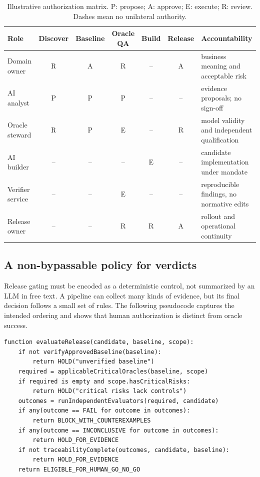 \documentclass[11pt,a4paper]{article}
\begin{document}
\begin{table}[htbp]
\centering\footnotesize
\caption{Illustrative authorization matrix. P: propose; A: approve; E: execute; R: review. Dashes mean no unilateral authority.}
\begin{tabularx}{\linewidth}{@{}p{28mm}cccccX@{}}
\toprule
Role & Discover & Baseline & Oracle QA & Build & Release & Accountability \\
\midrule
Domain owner & R & A & R & -- & A & business meaning and acceptable risk \\
AI analyst & P & P & P & -- & -- & evidence proposals; no sign-off \\
Oracle steward & R & P & E & -- & R & model validity and independent qualification \\
AI builder & -- & -- & -- & E & -- & candidate implementation under mandate \\
Verifier service & -- & -- & E & -- & -- & reproducible findings, no normative edits \\
Release owner & -- & -- & R & R & A & rollout and operational continuity \\
\bottomrule
\end{tabularx}
\label{tab:roles}
\end{table}

\subsection{A non-bypassable policy for verdicts}
Release gating must be encoded as a deterministic control, not summarized by an LLM in free text. A pipeline can collect many kinds of evidence, but its final decision follows a small set of rules. The following pseudocode captures the intended ordering and shows that human authorization is distinct from oracle success.

\begin{lstlisting}[caption={Normative gate policy, expressed as pseudocode.},label={lst:gate}]
function evaluateRelease(candidate, baseline, scope):
    if not verifyApprovedBaseline(baseline):
        return HOLD("unverified baseline")
    required = applicableCriticalOracles(baseline, scope)
    if required is empty and scope.hasCriticalRisks:
        return HOLD("critical risks lack controls")
    outcomes = runIndependentEvaluators(required, candidate)
    if any(outcome == FAIL for outcome in outcomes):
        return BLOCK_WITH_COUNTEREXAMPLES
    if any(outcome == INCONCLUSIVE for outcome in outcomes):
        return HOLD_FOR_EVIDENCE
    if not traceabilityComplete(outcomes, candidate, baseline):
        return HOLD_FOR_EVIDENCE
    return ELIGIBLE_FOR_HUMAN_GO_NO_GO
\end{lstlisting}
\end{document}
